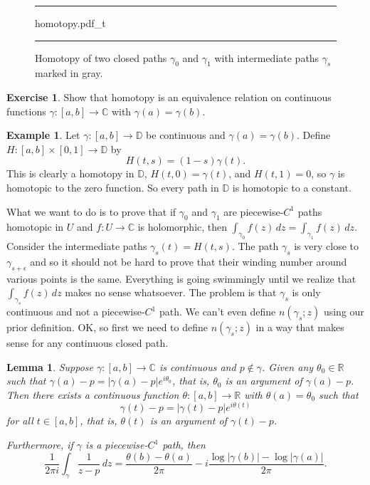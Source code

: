 \documentclass[12pt,openany]{book}
\newcommand{\sabs}[1]{\lvert {#1} \rvert}
\newcommand{\C}{{\mathbb{C}}}
\newcommand{\R}{{\mathbb{R}}}
\newcommand{\D}{{\mathbb{D}}}
\theoremstyle{plain}
\newtheorem{lemma}[thm]{Lemma}
\theoremstyle{remark}
\theoremstyle{definition}
\newenvironment{exbox}{%
    \def\FrameCommand{\vrule width 1pt \relax\hspace{10pt}}%
    \MakeFramed{\advance\hsize-\width\FrameRestore}%
}{%
    \endMakeFramed
}
\newenvironment{myfig}{%
\begin{figure}[h!t]
\noindent\rule{\textwidth}{0.5pt}\vspace{12pt}\par\centering}%
{\par\noindent\rule{\textwidth}{0.5pt}
\end{figure}}
\theoremstyle{exercise}
\newtheorem{exercise}{Exercise}[section]
\theoremstyle{example}
\newtheorem{example}[thm]{Example}
\begin{document}
\begin{myfig}
{homotopy.pdf_t}
\caption{Homotopy of two closed paths $\gamma_0$ and
$\gamma_1$ with intermediate paths $\gamma_s$ marked in gray.\label{fig:homotopy}}
\end{myfig}

\begin{exbox}
\begin{exercise}
Show that homotopy is an equivalence relation on continuous functions
$\gamma \colon [a,b] \to \C$ with $\gamma(a)=\gamma(b)$.
\end{exercise}
\end{exbox}

\begin{example} \label{example:homotopydiscsc}
Let $\gamma \colon [a,b] \to \D$ be continuous and $\gamma(a)=\gamma(b)$.  Define
$H \colon [a,b] \times [0,1] \to \D$ by
\begin{equation*}
H(t,s) = (1-s) \gamma(t) .
\end{equation*}
This is clearly a homotopy in $\D$, $H(t,0) = \gamma(t)$,
and $H(t,1) = 0$, so $\gamma$ is homotopic to the zero function.
So every path in $\D$ is homotopic to a constant.
\end{example}

What we want to do is to prove that if $\gamma_0$ and $\gamma_1$ are
piecewise-$C^1$ paths homotopic in $U$ and $f \colon U \to \C$ is holomorphic, then
$\int_{\gamma_0} f(z)\,dz = \int_{\gamma_1} f(z)\, dz$.
Consider the intermediate paths $\gamma_s(t) = H(t,s)$.
The path $\gamma_s$ is very close to
$\gamma_{s+\epsilon}$ and so it should not be hard to prove that their
winding number around various points is the same.
Everything is going swimmingly until we realize that $\int_{\gamma_s} f(z)
\, dz$ makes no sense whatsoever.  The problem is that $\gamma_s$ is only
continuous and not a piecewise-$C^1$ path.  We can't
even define $n(\gamma_s;z)$ using our prior definition.
OK, so first we need to define $n(\gamma_s;z)$ in a way that makes sense for
any continuous closed path.

\begin{lemma} \label{lemma:existenceoftheta}
Suppose $\gamma \colon [a,b] \to \C$ is continuous and $p \notin
\gamma$.  Given any $\theta_0 \in \R$ such that
$\gamma(a)-p = \sabs{\gamma(a)-p} e^{i\theta_0}$, that is,
$\theta_0$ is an argument of $\gamma(a)-p$.
Then there exists a continuous function
$\theta \colon [a,b] \to \R$ with $\theta(a) = \theta_0$ such that
\begin{equation*}
\gamma(t)-p = \sabs{\gamma(t)-p} e^{i\theta(t)}
\end{equation*}
for all $t \in [a,b]$, that is, $\theta(t)$ is an argument of $\gamma(t)-p$.

Furthermore, if $\gamma$ is a piecewise-$C^1$ path, then
\begin{equation*}
\frac{1}{2\pi i} \int_\gamma \frac{1}{z-p} \, dz =
\frac{\theta(b)-\theta(a)}{2\pi} 
- i \frac{\log \sabs{\gamma(b)} - \log \sabs{\gamma(a)}}{2\pi} .
\end{equation*}
\end{lemma}
\end{document}
